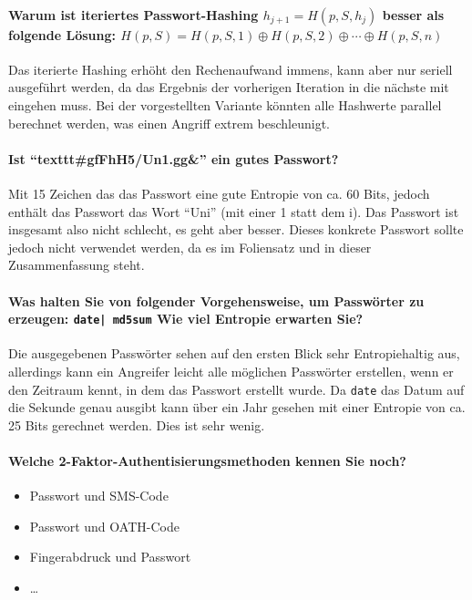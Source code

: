 \documentclass[a4paper, 11pt, accentcolor = tud3b]{tudreport}
\begin{document}
			\paragraph{Warum ist iteriertes Passwort-Hashing \(h_{j+1} = H(p, S, h_j) \) besser als folgende Lösung: \( H(p, S) = H(p, S, 1) \oplus H(p, S, 2) \oplus \cdots \oplus H(p, S, n) \) }
			Das iterierte Hashing erhöht den Rechenaufwand immens, kann aber nur seriell ausgeführt werden, da das Ergebnis der vorherigen Iteration in die nächste mit eingehen muss. Bei der vorgestellten Variante könnten alle Hashwerte parallel berechnet werden, was einen Angriff extrem beschleunigt.
			
			\paragraph{Ist \enquote{texttt{\#gfFhH5/Un1.gg\&}} ein gutes Passwort?}
			Mit 15 Zeichen das das Passwort eine gute Entropie von ca. 60 Bits, jedoch enthält das Passwort das Wort \enquote{Uni} (mit einer 1 statt dem i). Das Passwort ist insgesamt also nicht schlecht, es geht aber besser. Dieses konkrete Passwort sollte jedoch nicht verwendet werden, da es im Foliensatz und in dieser Zusammenfassung steht.
			
			\paragraph{Was halten Sie von folgender Vorgehensweise, um Passwörter zu erzeugen: \texttt{date| md5sum} Wie viel Entropie erwarten Sie?}
			Die ausgegebenen Passwörter sehen auf den ersten Blick sehr Entropiehaltig aus, allerdings kann ein Angreifer leicht alle möglichen Passwörter erstellen, wenn er den Zeitraum kennt, in dem das Passwort erstellt wurde. Da \texttt{date} das Datum auf die Sekunde genau ausgibt kann über ein Jahr gesehen mit einer Entropie von ca. 25 Bits gerechnet werden. Dies ist sehr wenig.
			
			\paragraph{Welche 2-Faktor-Authentisierungsmethoden kennen Sie noch?}
			\begin{itemize}
				\item Passwort und SMS-Code
				\item Passwort und OATH-Code
				\item Fingerabdruck und Passwort
				\item \dots
			\end{itemize}
			
\end{document}
